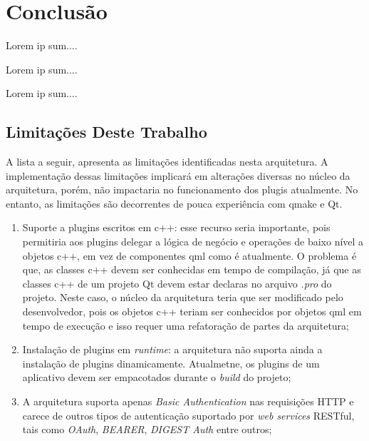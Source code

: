 \section{Conclusão}\label{sec:conclusao}
Lorem ip sum....\par
Lorem ip sum....\par
Lorem ip sum....\par


\subsection{Limitações Deste Trabalho}
A lista a seguir, apresenta as limitações identificadas nesta arquitetura. A implementação dessas limitações implicará em alterações diversas no núcleo da arquitetura, porém, não impactaria no funcionamento dos plugis atualmente. No entanto, as limitações são decorrentes de pouca experiência com qmake e Qt.

\begin{enumerate}
	\item Suporte a plugins escritos em c++: esse recurso seria importante, pois permitiria aos plugins delegar a lógica de negócio e operações de baixo nível a objetos c++, em vez de componentes qml como é atualmente. O problema é que, as classes c++ devem ser conhecidas em tempo de compilação, já que as classes c++ de um projeto Qt devem estar declaras no arquivo \textit{.pro} do projeto. Neste caso, o núcleo da arquitetura teria que ser modificado pelo desenvolvedor, pois os objetos c++ teriam ser conhecidos por objetos qml em tempo de execução e isso requer uma refatoração de partes da arquitetura;

	\item Instalação de plugins em \textit{runtime}: a arquitetura não suporta ainda a instalação de plugins dinamicamente. Atualmetne, os plugins de um aplicativo devem ser empacotados durante o \textit{build} do projeto;

	\item A arquitetura suporta apenas \textit{Basic Authentication} nas requisições HTTP e carece de outros tipos de autenticação suportado por \textit{web services} RESTful, tais como \textit{OAuth}, \textit{BEARER}, \textit{DIGEST Auth} entre outros;
\end{enumerate}


